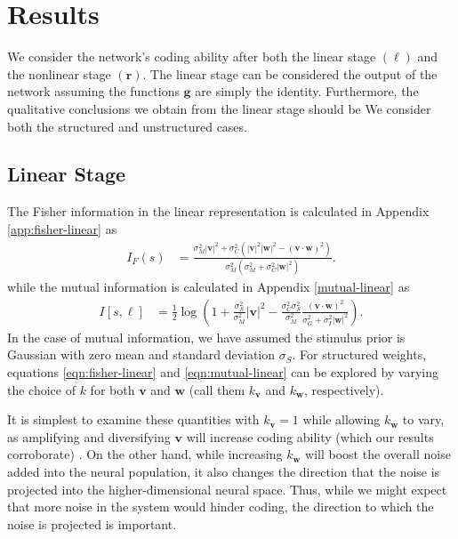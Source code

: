 \documentclass[11pt]{article}
\begin{document}
	\section{Results}
	We consider the network's coding ability after both the linear stage $(\boldsymbol{\ell})$ and the nonlinear stage $(\mathbf{r})$. The linear stage can be considered the output of the network assuming the functions $\mathbf{g}$ are simply the identity. Furthermore, the qualitative conclusions we obtain from the linear stage should be  We consider both the structured and unstructured cases.
	\subsection{Linear Stage}
	The Fisher information in the linear representation is calculated in Appendix \ref{app:fisher-linear} as 
	\begin{align}
		I_F(s) &= \frac{\sigma_M^2 |\mathbf{v}|^2 + \sigma_C^2 \left(|\mathbf{v}|^2|\mathbf{w}|^2 - (\mathbf{v}\cdot\mathbf{w})^2\right)}{\sigma_M^2 (\sigma_M^2 + \sigma_C^2 |\mathbf{w}|^2)}. \label{eqn:fisher-linear}
	\end{align}
	while the mutual information is calculated in Appendix \ref{mutual-linear} as
	\begin{align}
		I[s, \boldsymbol{\ell}] &= \frac{1}{2} \log \left(1 + \frac{\sigma_S^2}{\sigma_M^2} |\mathbf{v}|^2 - \frac{\sigma_C^2 \sigma_S^2}{\sigma_M^2} \frac{(\mathbf{v}\cdot\mathbf{w})^2}{\sigma_G^2 + \sigma_I^2 |\mathbf{w}|^2}\right). \label{eqn:mutual-linear}
	\end{align}
	In the case of mutual information, we have assumed the stimulus prior is Gaussian with zero mean and standard deviation $\sigma_S$. For structured weights, equations \ref{eqn:fisher-linear} and \ref{eqn:mutual-linear} can be explored by varying the choice of $k$ for both $\mathbf{v}$ and $\mathbf{w}$ (call them $k_{\mathbf{v}}$ and $k_{\mathbf{w}}$, respectively).
	
	It is simplest to examine these quantities with $k_{\mathbf{v}}=1$ while allowing $k_{\mathbf{w}}$ to vary, as amplifying and diversifying $\mathbf{v}$ will increase coding ability (which our results corroborate) \cite{Ecker2011}. On the other hand, while increasing $k_{\mathbf{w}}$ will boost the overall noise added into the neural population, it also changes the direction that the noise is projected into the higher-dimensional neural space. Thus, while we might expect that more noise in the system would hinder coding, the direction to which the noise is projected is important. 
	
\end{document}

